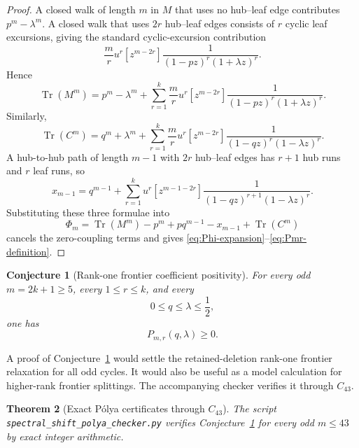 \documentclass[11pt]{article}
\newtheorem{theorem}{Theorem}[section]
\newtheorem{conjecture}[theorem]{Conjecture}
\newcommand{\Tr}{\operatorname{Tr}}
\begin{document}
\begin{proof}
A closed walk of length $m$ in $M$ that uses no hub--leaf edge contributes $p^m-\lambda^m$.  A closed walk that uses $2r$ hub--leaf edges consists of $r$ cyclic leaf excursions, giving the standard cyclic-excursion contribution
\[
        \frac{m}{r}u^r[z^{m-2r}]
        \frac{1}{(1-pz)^r(1+\lambda z)^r}.
\]
Hence
\[
        \Tr(M^m)=p^m-\lambda^m
        +\sum_{r=1}^k\frac{m}{r}u^r[z^{m-2r}]
        \frac{1}{(1-pz)^r(1+\lambda z)^r}.
\]
Similarly,
\[
        \Tr(C^m)=q^m+\lambda^m
        +\sum_{r=1}^k\frac{m}{r}u^r[z^{m-2r}]
        \frac{1}{(1-qz)^r(1-\lambda z)^r}.
\]
A hub-to-hub path of length $m-1$ with $2r$ hub--leaf edges has $r+1$ hub runs and $r$ leaf runs, so
\[
        x_{m-1}=q^{m-1}
        +\sum_{r=1}^k u^r[z^{m-1-2r}]
        \frac{1}{(1-qz)^{r+1}(1-\lambda z)^r}.
\]
Substituting these three formulae into
\[
        \Phi_m=\Tr(M^m)-p^m+pq^{m-1}-x_{m-1}+\Tr(C^m)
\]
cancels the zero-coupling terms and gives \eqref{eq:Phi-expansion}--\eqref{eq:Pmr-definition}.
\end{proof}

\begin{conjecture}[Rank-one frontier coefficient positivity]\label{conj:Pmr}
For every odd $m=2k+1\ge5$, every $1\le r\le k$, and every
\[
        0\le q\le\lambda\le\frac12,
\]
one has
\[
        P_{m,r}(q,\lambda)\ge0.
\]
\end{conjecture}

A proof of Conjecture~\ref{conj:Pmr} would settle the retained-deletion rank-one frontier relaxation for all odd cycles.  It would also be useful as a model calculation for higher-rank frontier splittings.  The accompanying checker verifies it through $C_{43}$.

\begin{theorem}[Exact P\'olya certificates through $C_{43}$]\label{thm:polya-C43}
The script \texttt{spectral\_shift\_polya\_checker.py} verifies Conjecture~\ref{conj:Pmr} for every odd $m\le43$ by exact integer arithmetic.
\end{theorem}
\end{document}
